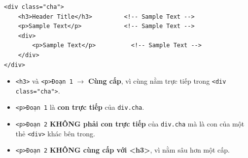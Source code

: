 \documentclass[11pt,oneside]{book}
\newcommand{\thd}[1]{\textcolor{white}{\textbf{\strut #1}}}
\newcommand{\codeinline}[1]{\textcolor{accentOrange}{\texttt{#1}}}
\begin{document}
\begin{codeWindow}
\begin{lstlisting}[language=HTML5]
<div class="cha">
    <h3>Header Title</h3>         <!-- Sample Text -->
    <p>Sample Text</p>            <!-- Sample Text -->
    <div>
        <p>Sample Text</p>          <!-- Sample Text -->
    </div>
</div>
\end{lstlisting}
\end{codeWindow}

\begin{noteBox}
\begin{itemize}[leftmargin=1.5em, itemsep=3pt, parsep=0pt]
    \item \codeinline{<h3>} và \codeinline{<p>Đoạn 1} $\rightarrow$ \textcolor{tipBorder}{\textbf{Cùng cấp}}, vì cùng nằm trực tiếp trong \codeinline{<div class="cha">}.
    \item \codeinline{<p>Đoạn 1} là \textcolor{tipBorder}{\textbf{con trực tiếp}} của \codeinline{div.cha}.
    \item \codeinline{<p>Đoạn 2} \textcolor{warnBorder}{\textbf{KHÔNG phải con trực tiếp}} của \codeinline{div.cha} mà là con của một thẻ \codeinline{<div>} khác bên trong.
    \item \codeinline{<p>Đoạn 2} \textcolor{warnBorder}{\textbf{KHÔNG cùng cấp với <h3>}}, vì nằm sâu hơn một cấp.
\end{itemize}
\end{noteBox}

\begin{prettyTableBox}
\sffamily\small
{}
\end{prettyTableBox}
\end{document}
